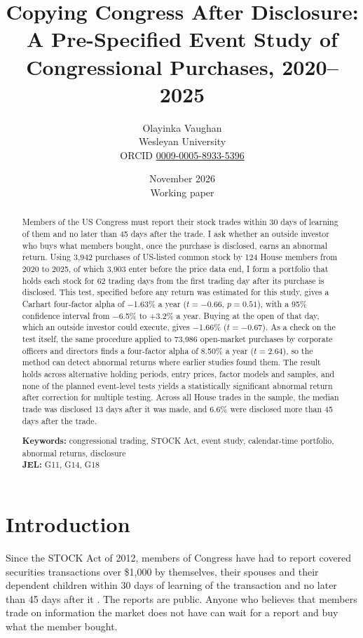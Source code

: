 \documentclass[11pt]{article}
\title{Copying Congress After Disclosure:\\A Pre-Specified Event Study of Congressional Purchases, 2020--2025}
\author{Olayinka Vaughan\\
\small Wesleyan University\\
\small ORCID \href{https://orcid.org/0009-0005-8933-5396}{0009-0005-8933-5396}}
\date{November 2026\\[2pt]\small Working paper}
\newcommand{\m}{\ensuremath{-}}
\begin{document}
\maketitle

\begin{abstract}
\noindent Members of the US Congress must report their stock trades within 30 days of learning of them and no later than 45 days after the trade. I ask whether an outside investor who buys what members bought, once the purchase is disclosed, earns an abnormal return. Using 3,942 purchases of US-listed common stock by 124 House members from 2020 to 2025, of which 3,903 enter before the price data end, I form a portfolio that holds each stock for 62 trading days from the first trading day after its purchase is disclosed. This test, specified before any return was estimated for this study, gives a Carhart four-factor alpha of \m1.63\% a year ($t = \m0.66$, $p = 0.51$), with a 95\% confidence interval from \m6.5\% to +3.2\% a year. Buying at the open of that day, which an outside investor could execute, gives \m1.66\% ($t = \m0.67$). As a check on the test itself, the same procedure applied to 73,986 open-market purchases by corporate officers and directors finds a four-factor alpha of 8.50\% a year ($t = 2.64$), so the method can detect abnormal returns where earlier studies found them. The result holds across alternative holding periods, entry prices, factor models and samples, and none of the planned event-level tests yields a statistically significant abnormal return after correction for multiple testing. Across all House trades in the sample, the median trade was disclosed 13 days after it was made, and 6.6\% were disclosed more than 45 days after the trade.

\medskip
\noindent\textbf{Keywords:} congressional trading, STOCK Act, event study, calendar-time portfolio, abnormal returns, disclosure\\
\textbf{JEL:} G11, G14, G18
\end{abstract}

\section{Introduction}

Since the STOCK Act of 2012, members of Congress have had to report covered securities transactions over \$1,000 by themselves, their spouses and their dependent children within 30 days of learning of the transaction and no later than 45 days after it \citep{stockact2012,houseethics2026}. The reports are public. Anyone who believes that members trade on information the market does not have can wait for a report and buy what the member bought.
\end{document}
